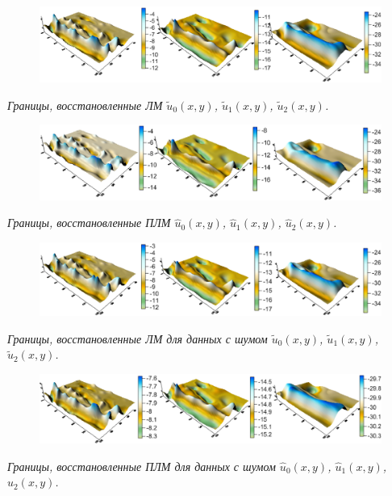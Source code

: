 \documentclass[10pt,pdf, mathserif, hyperref={unicode}]{beamer}
\begin{document}
\begin{frame}
	\begin{figure}
		\centering
		\includegraphics[height=0.2\textheight]{levmar}
	\end{figure}
	\centering\textit{Границы, восстановленные ЛМ $\tilde{u}_0(x,y)$, $\tilde{u}_1(x,y)$, $\tilde{u}_2(x,y)$.}
	\begin{figure}
		\centering
		\includegraphics[height=0.2\textheight]{clm}
	\end{figure}
	\centering\textit{Границы, восстановленные ПЛМ $\hat{u}_0(x,y)$, $\hat{u}_1(x,y)$, $\hat{u}_2(x,y)$.}
\end{frame}
\begin{frame}
	\begin{figure}
		\centering
		\includegraphics[height=0.2\textheight]{lm_noise}
	\end{figure}
	\centering\textit{Границы, восстановленные ЛМ для данных с шумом $\tilde{u}_0(x,y)$, $\tilde{u}_1(x,y)$, $\tilde{u}_2(x,y)$.}
	\begin{figure}
		\centering
		\includegraphics[height=0.2\textheight]{clm_noise}
	\end{figure}
	\centering\textit{Границы, восстановленные ПЛМ для данных с шумом $\hat{u}_0(x,y)$, $\hat{u}_1(x,y)$, $\hat{u}_2(x,y)$.}
\end{frame}
\end{document}

